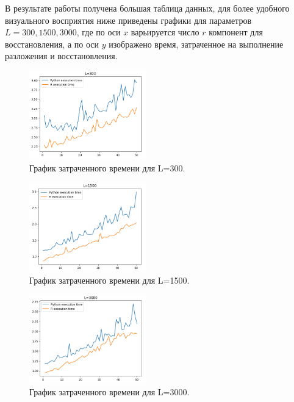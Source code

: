 \documentclass[specialist,
			   substylefile = spbu_report.rtx,
			   subf,href,colorlinks=true, 12pt]{disser}
\begin{document}
В результате работы получена большая таблица данных, для более удобного визуального восприятия ниже приведены графики для параметров $L = 300, 1500, 3000$, где по оси $x$ варьируется число $r$ компонент для восстановления, а по оси $y$ изображено время, затраченное на выполнение разложения и восстановления.

\begin{figure}[H]
\centering
\includegraphics[width=0.45\textwidth]{time_test_L_300.png}
\caption{График затраченного времени для L=300.}
\label{fig:time_test_L_300}
\end{figure}

\begin{figure}[H]
	\centering
	\includegraphics[width=0.45\textwidth]{time_test_L_1500.png}
	\caption{График затраченного времени для L=1500.}
	\label{fig:time_test_L_1500}
\end{figure}

\begin{figure}[H]
	\centering
	\includegraphics[width=0.45\textwidth]{time_test_L_3000.png}
	\caption{График затраченного времени для L=3000.}
	\label{fig:time_test_L_3000}
\end{figure}
\end{document}
